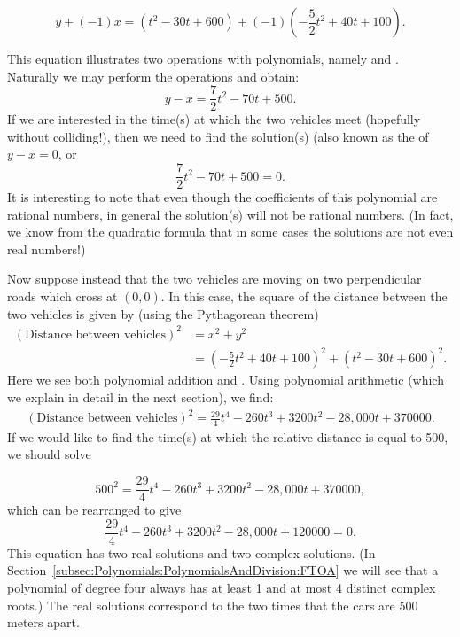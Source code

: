 $$ y + (-1)x =  (t^2- 30t + 600) + (-1)(-\frac{5}{2} t^2+ 40t + 100).$$

This equation illustrates two operations with polynomials, namely  and .  Naturally we may perform the operations and obtain:
$$ y -x =  \frac{7}{2} t^2- 70t + 500.$$
If we are interested in the time(s) at which the two vehicles meet (hopefully without colliding!), then we need to find the solution(s) (also known as the  of  $y-x = 0$, or
$$   \frac{7}{2} t^2 - 70t + 500 = 0.$$
It is interesting to note that even though the coefficients of this polynomial are rational numbers, in general the solution(s) will not be rational numbers. (In fact, we know from the quadratic formula that in some cases the solutions are not even real numbers!)

Now suppose instead that the two vehicles are moving on two perpendicular roads which cross at $(0,0)$.  In this case, the square of the distance between the two vehicles is given by (using the Pythagorean theorem)
\begin{align*}
(\text{Distance between vehicles})^2 &= x^2 + y^2 \\
&= (-\frac{5}{2} t^2+ 40t + 100)^2 + (t^2- 30t + 600)^2.
\end{align*}
Here we see both polynomial addition and . Using polynomial arithmetic (which we explain in detail in the next section), we find:
\begin{align*}
(\text{Distance between vehicles})^2 = \frac{29}{4}t^4 - 260t^3+3200t^2-28,000t+370000.
\end{align*}
If we would like to find the time(s) at which the relative distance is equal to 500, we should solve

$$500^2 = \frac{29}{4}t^4 - 260t^3+3200t^2-28,000t+370000, $$
which can be rearranged to give
$$ \frac{29}{4}t^4 - 260t^3+3200t^2-28,000t+120000=0.$$
This equation has two real solutions and two complex solutions. (In Section~\ref{subsec:Polynomials:PolynomialsAndDivision:FTOA} we will see that a  polynomial of degree four always has at least 1 and at most 4 distinct complex roots.) The real solutions correspond to the two times that the cars are 500 meters apart. 
  
